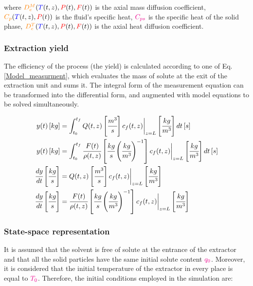 \documentclass[../Article_Model_Parameters.tex]{subfiles}
\begin{document}
			where $ {\color{orange}D^M_e}({\color{blue}T}(t,z),{\color{red}P}(t),{\color{red}F}(t))$ is the axial mass diffusion coefficient, ${\color{orange}C_p}({\color{blue}T}(t,z),{\color{red}P}(t))$ is the fluid's specific heat, ${\color{magenta}C_{ps}}$ is the specific heat of the solid phase, ${\color{orange}D^T_e}({\color{blue}T}(t,z),{\color{red}P}(t),{\color{red}F}(t))$ is the axial heat diffusion coefficient.
			
			\subsubsection{Extraction yield} \label{CH: Yield}
			
			The efficiency of the process (the yield) is calculated according to one of Eq. \ref{Model_measurment}, which evaluates the mass of solute at the exit of the extraction unit and sums it. The integral form of the measurement equation can be transformed into the differential form, and augmented with model equations to be solved simultaneously.
			
			{\footnotesize
				\begin{align} 
					\label{Model_measurment}
					y(t) \left[ kg \right] &= \int_{t_0}^{t_f} Q(t,z) \left[ \cfrac{m^3}{s} \right] c_f(t,z) \biggr\rvert_{z=L} \left[ \cfrac{kg}{m^3} \right] dt \left[ s \right] \\
					y(t) \left[ kg \right] &= \int_{t_0}^{t_f} \cfrac{F(t)}{\rho(t,z)} \left[ \cfrac{kg}{s} \left( \cfrac{kg}{m^3} \right)^{-1} \right] c_f(t,z) \biggr\rvert_{z=L} \left[ \cfrac{kg}{m^3} \right] dt \left[ s \right] 	\\
					\cfrac{dy}{dt} \left[ \cfrac{kg}{s} \right] &= Q(t,z) \left[ \cfrac{m^3}{s} \right] c_f(t,z) \biggr\rvert_{z=L} \left[ \cfrac{kg}{m^3} \right]  \\
					\cfrac{dy}{dt} \left[ \cfrac{kg}{s} \right] &= \cfrac{F(t)}{\rho(t,z)} \left[ \cfrac{kg}{s} \left( \cfrac{kg}{m^3} \right)^{-1} \right] c_f(t,z) \biggr\rvert_{z=L} \left[ \cfrac{kg}{m^3} \right]
			\end{align}	}
			
			\subsubsection{State-space representation} \label{CH: State_space}
			It is assumed that the solvent is free of solute at the entrance of the extractor and that all the solid particles have the same initial solute content ${\color{magenta}q_0}$. Moreover, it is considered that the initial temperature of the extractor in every place is equal to ${\color{magenta}T_0}$. Therefore, the initial conditions employed in the simulation are:
			
\end{document}

